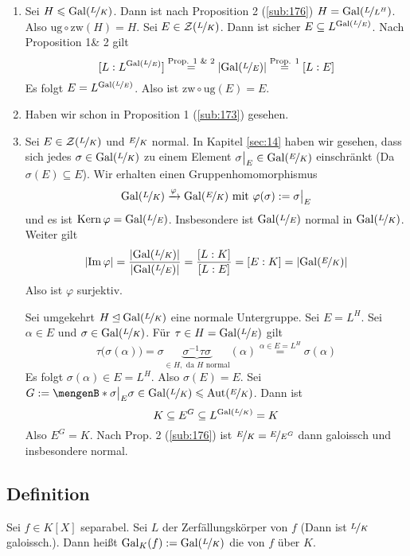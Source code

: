 \begin{enumerate}[(1)]
	\item Sei $H \le \Gal(\nicefrac{L}{K})$. Dann ist nach Proposition 2 (\ref{sub:176}) $H= \Gal(\nicefrac{L}{L^H})$. Also $\mathrm{ug} \circ \mathrm{zw}(H)=H$. Sei
	$E \in \mathcal{Z}(\nicefrac{L}{K})$. Dann ist sicher $E  \subseteq L^{\Gal(\nicefrac{L}{E})}$. Nach Proposition 1\& 2 gilt 
	\[
		[L:L^{\Gal(\nicefrac{L}{E})}] \stackrel{\text{Prop. 1 \& 2}}{=} \abs*{\Gal(\nicefrac{L}{E})} \stackrel{\text{Prop. 1}}{=} [L :E]
	\]
	Es folgt $E= L^{\Gal(\nicefrac{L}{E})}$. Also ist $\mathrm{zw} \circ \mathrm{ug}(E)=E$.
	\item Haben wir schon in Proposition 1 (\ref{sub:173}) gesehen.
	\item Sei $E \in \mathcal{Z}(\nicefrac{L}{K})$ und $\nicefrac{E}{K}$ normal. In Kapitel \ref{sec:14} haben wir gesehen, dass sich jedes $\sigma \in \Gal(\nicefrac{L}{K})$
	zu einem Element $\sigma\big|_E \in \Gal(\nicefrac{E}{K})$ einschränkt (Da $\sigma(E) \subseteq E$). Wir erhalten einen Gruppenhomomorphismus 
	\[
		\Gal(\nicefrac{L}{K}) \xrightarrow{\varphi} \Gal(\nicefrac{E}{K}) \text{ mit } \varphi(\sigma) := \sigma\big|_E 
	\]
	und es ist $\Kern \varphi = \Gal(\nicefrac{L}{E})$. Insbesondere ist $\Gal(\nicefrac{L}{E})$ normal in $\Gal(\nicefrac{L}{K})$. Weiter gilt
	\[
		\abs*{\im \varphi} = \frac{\abs*{\Gal(\nicefrac{L}{K})} }{\abs*{\Gal(\nicefrac{L}{E})} }  = \frac{[L:K]}{[L:E]} = [E:K] = \abs*{\Gal(\nicefrac{E}{K})} 
	\]
	Also ist $\varphi$ surjektiv. 
	
	Sei umgekehrt $H \unlhd \Gal(\nicefrac{L}{K})$ eine normale Untergruppe. Sei $E=L^H$. Sei $\alpha \in E$ und $\sigma \in \Gal(\nicefrac{L}{K})$. Für 
	$\tau\in H= \Gal(\nicefrac{L}{E})$ gilt
	\[
		\tau\big(\sigma(\alpha)\big) = \sigma \underbrace{\sigma ^{-1} \tau \sigma}_{\in H, \text{ da } H \text{ normal}} (\alpha) \stackrel{\alpha \in E=L^H}{=} \sigma(\alpha)
	\]
	Es folgt $\sigma(\alpha) \in E=L^H$. Also $\sigma(E) =E$. Sei $G:= \set[\sigma\big|_E]{\sigma \in \Gal(\nicefrac{L}{K})} \le \Aut(\nicefrac{E}{K})$. Dann ist 
	\[
		K \subseteq E^G \subseteq L^{\Gal(\nicefrac{L}{K})} = K
	\]
	Also $E^G=K$. Nach Prop. 2 (\ref{sub:176}) ist $\nicefrac{E}{K} = \nicefrac{E}{E^G}$ dann galoissch und insbesondere normal. \bewende
\end{enumerate}

\subsection[Definition: Galois-Gruppe eines Polynoms]{Definition} %
\label{sub:179}
Sei $f \in K[X]$ separabel. Sei $L$ der Zerfällungskörper von $f$ (Dann ist $\nicefrac{L}{K}$ galoissch.). Dann heißt $\Gal_K(f) := \Gal(\nicefrac{L}{K})$ die
 von $f$ über $K$.

